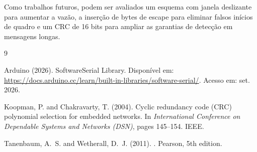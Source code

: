 \documentclass[12pt]{article}
\begin{document}
Como trabalhos futuros, podem ser avaliados um esquema com janela deslizante para aumentar a vazão, a inserção de bytes de escape para eliminar falsos inícios de quadro e um CRC de 16 bits para ampliar as garantias de detecção em mensagens longas.

\begin{thebibliography}{9}

Arduino (2026).
\newblock SoftwareSerial Library.
\newblock Disponível em: \url{https://docs.arduino.cc/learn/built-in-libraries/software-serial/}. Acesso em: set. 2026.

Koopman, P. and Chakravarty, T. (2004).
\newblock Cyclic redundancy code ({CRC}) polynomial selection for embedded networks.
\newblock In {\em International Conference on Dependable Systems and Networks (DSN)}, pages 145--154. IEEE.

Tanenbaum, A.~S. and Wetherall, D.~J. (2011).
.
\newblock Pearson, 5th edition.

\end{thebibliography}
\end{document}
